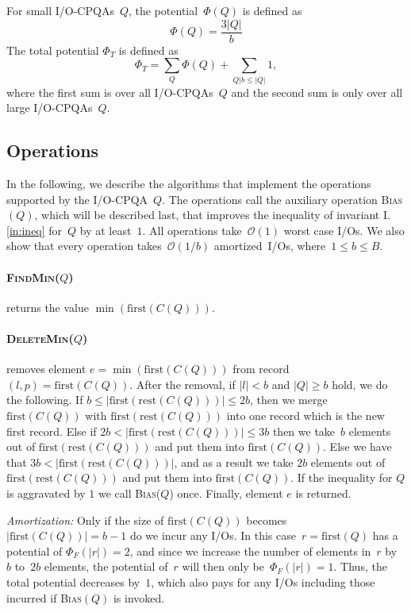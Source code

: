 \documentclass[]{article}
\newcommand{\first}{\text{first}}
\newcommand{\rest}{\text{rest}}
\newcommand{\bigO}{\mathcal{O}}
\newcommand{\iref}[1]{I.\ref{#1}}
\begin{document}
For small I/O-CPQAs~$Q$, the potential~$\Phi(Q)$ is defined as
\[
  \Phi(Q) = \frac{3|Q|}{b}
\]
The total potential $\Phi_T$ is defined as
\[
  \Phi_T = \sum_{Q}{\Phi(Q)} + \sum_{Q|b \leq |Q|}{1},
\]
where the first sum is over all I/O-CPQAs~$Q$ and the second sum is only over
all large I/O-CPQAs~$Q$.

\subsection{Operations}


In the following, we describe the algorithms that implement the operations
supported by the I/O-CPQA~$Q$. The operations call the auxiliary operation
\textsc{Bias}$(Q)$, which will be described last, that improves the inequality
of invariant \iref{in:ineq} for~$Q$ by at least~$1$. All operations
take~$\bigO(1)$ worst case I/Os.  We also show that every operation
takes~$\bigO(1/b)$ amortized~I/Os, where~$1 \leq b \leq B$.

\paragraph{\textsc{FindMin}($Q$)} returns the value $\min(\first(C(Q)))$. 

\paragraph{\textsc{DeleteMin}($Q$)} removes element $e = \min(\first(C(Q)))$
from record $(l,p) = \first(C(Q))$. After the removal, if $|l| < b$ and $|Q|
\geq b$ hold, we do the following. If $b \leq |\first(\rest(C(Q)))| \leq 2b$,
then we merge $\first (C(Q))$ with $\first (\rest(C(Q)))$ into one record which
is the new first record. Else if $2b < |\first(\rest(C(Q)))| \leq 3b$ then we
take~$b$ elements out of $\first(\rest(C(Q)))$ and put them into $\first(C(Q))$.
Else we have that $3b < |\first(\rest(C(Q)))|$, and as a result we take $2b$
elements out of $\first(\rest(C(Q)))$ and put them into $\first(C(Q))$. If the
inequality for $Q$ is aggravated by $1$ we call \textsc{Bias}($Q$) once.
Finally, element $e$ is returned. 

\noindent \textit{Amortization:} Only if the size of $\first(C(Q))$ becomes
$|\first(C(Q))| = b -1$ do we incur any I/Os. In this case~$r =\first(Q)$ has a
potential of $\Phi_F(|r|) =2$, and since we increase the number of elements
in~$r$ by~$b$ to~$2b$ elements, the potential of~$r$ will then only
be~$\Phi_F(|r|) =1$. Thus, the total potential decreases by~$1$, which also pays
for any I/Os including those incurred if \textsc{Bias}$(Q)$ is invoked.
\end{document}
